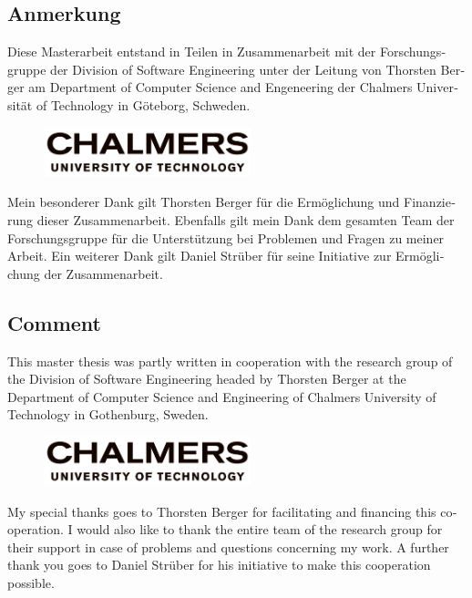 
\begin{otherlanguage}{ngerman}
    \section*{Anmerkung}

Diese Masterarbeit entstand in Teilen in Zusammenarbeit mit der Forschungsgruppe der Division of Software Engineering unter der Leitung von Thorsten Berger am Department of Computer Science and Engeneering der Chalmers Universität of Technology in Göteborg, Schweden.

\begin{figure}[H]
    \centering
    \includegraphics[width=6cm]{logos/chalmers}
\label{fig:chalmers}
\end{figure}

Mein besonderer Dank gilt Thorsten Berger für die Ermöglichung und Finanzierung dieser Zusammenarbeit. Ebenfalls gilt mein Dank dem gesamten Team der Forschungsgruppe für die Unterstützung bei Problemen und Fragen zu meiner Arbeit. Ein weiterer Dank gilt Daniel Strüber für seine Initiative zur Ermöglichung der Zusammenarbeit.

\end{otherlanguage}

\begin{otherlanguage}{english}
    \section*{Comment}

This master thesis was partly written in cooperation with the research group of the Division of Software Engineering headed by Thorsten Berger at the Department of Computer Science and Engineering of Chalmers University of Technology in Gothenburg, Sweden.

\begin{figure}[H]
    \centering
    \includegraphics[width=6cm]{logos/chalmers}
\label{fig:chalmers}
\end{figure}

My special thanks goes to Thorsten Berger for facilitating and financing this cooperation. I would also like to thank the entire team of the research group for their support in case of problems and questions concerning my work. A further thank you goes to Daniel Strüber for his initiative to make this cooperation possible.

\end{otherlanguage}
\cleardoublepage